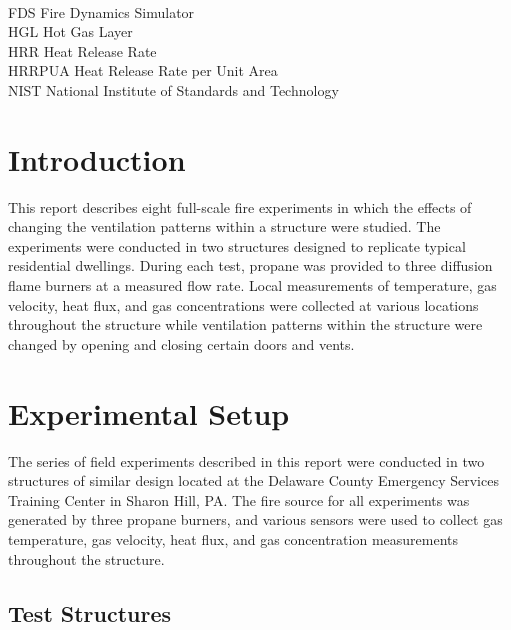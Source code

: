 \documentclass[12pt,oneside]{book}
\begin{document}
\begin{tabbing}
\hspace{1.5in} \= \\
FDS \> Fire Dynamics Simulator \\
HGL \> Hot Gas Layer \\
HRR \> Heat Release Rate \\
HRRPUA \> Heat Release Rate per Unit Area \\
NIST \> National Institute of Standards and Technology \\
\end{tabbing}

\mainmatter

\chapter{Introduction}
\label{chap:Introduction}


This report describes eight full-scale fire experiments in which the effects of changing the ventilation patterns within a structure were studied. The experiments were conducted in two structures designed to replicate typical residential dwellings. During each test, propane was provided to three diffusion flame burners at a measured flow rate. Local measurements of temperature, gas velocity, heat flux, and gas concentrations were collected at various locations throughout the structure while ventilation patterns within the structure were changed by opening and closing certain doors and vents.


\chapter{Experimental Setup}
\label{chap:Experimental_Setup}
The series of field experiments described in this report were conducted in two structures of similar design located at the Delaware County Emergency Services Training Center in Sharon Hill, PA. The fire source for all experiments was generated by three propane burners, and various sensors were used to collect gas temperature, gas velocity, heat flux, and gas concentration measurements throughout the structure.

\section{Test Structures}
\label{sec:Test_Structures}
\end{document}
